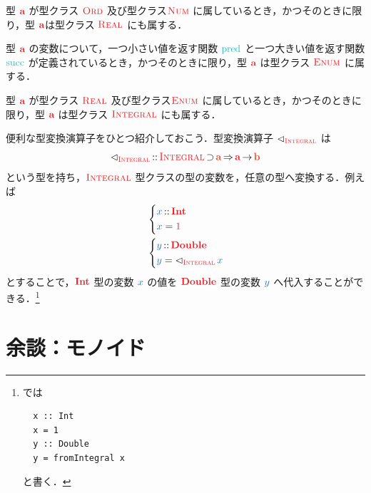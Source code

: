 \documentclass[a5paper,twoside,fleqn,draft]{jsbook}
\begin{document}
型 $\hTypeName{a}$ が型クラス $\hOrd$ 及び型クラス$\hNum$ に属しているとき，かつそのときに限り，型 $\hTypeName{a}$は型クラス $\hReal$ にも属する．

型 $\hTypeName{a}$ の変数について，一つ小さい値を返す関数 $\hPred$ と一つ大きい値を返す関数 $\hSucc$ が定義されているとき，かつそのときに限り，型 $\hTypeName{a}$ は型クラス $\hEnum$ に属する．

型 $\hTypeName{a}$ が型クラス $\hReal$ 及び型クラス$\hEnum$ に属しているとき，かつそのときに限り，型 $\hTypeName{a}$ は型クラス $\hIntegral$ にも属する．


\separator

便利な型変換演算子をひとつ紹介しておこう．型変換演算子
$\hFromIntegral$ は
\begin{equation}
  \hFromIntegral
  \hIsTypeOf{}\hIntegral\hHasElementsOf\mA
  \hAndThen\hTypeName{a}\hFunctionArrow\mB
\end{equation}
という型を持ち，$\hIntegral$ 型クラスの型の変数を，任意の型へ変換する．例えば
\begin{align}
  {}
  &\left\{
  \begin{aligned}
    \hVar{x}
    &\hIsTypeOf\hInt\\
    \hVar{x}
    &=\hConstant{1}
  \end{aligned}
  \right.\\
    {}
    &\left\{
    \begin{aligned}
      \hVar{y}
      &\hIsTypeOf\hDouble\\
      \hVar{y}
      &=\hFromIntegral\hVar{x}
    \end{aligned}
  \right.
\end{align}
とすることで，$\hInt$ 型の変数 $\hVar{x}$ の値を $\hDouble$ 型の変数 $\hVar{y}$ へ代入することができる．\footnote{\haskell では
\begin{verbatim}
  x :: Int
  x = 1
  y :: Double
  y = fromIntegral x
\end{verbatim}
と書く．}

\separator


\section{余談：モノイド}
\end{document}
